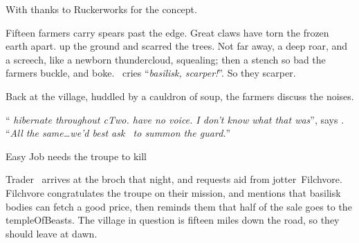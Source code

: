 \documentclass[10pt,twoside]{book}
\begin{document}

{
  \footnotesize

  \vfill
  {\sffamily With thanks to Ruckerworks for the concept.}
}

\clearpage


\pagestyle{minizine}%

\begin{exampletext}
  Fifteen farmers carry spears past the \gls{edge}.
  Great claws have torn
  \ifnum{}%
    the frozen earth apart.
  \else%
  up the ground and scarred the trees.
  \fi%
  Not far away, a deep roar, and a screech, like a newborn thundercloud, squealing;
  then a stench so bad the farmers buckle, and boke.
  \marketBoatman\ cries ``\textit{\gls{basilisk}, scarper!}''.
  So they scarper.

  Back at the \gls{village}, huddled by a cauldron of soup, the farmers discuss the noises.

  ``\textit{\ifnum{}
     hibernate throughout \gls{cTwo}.
  \else%
     have no voice.
  \fi%
  I don't know what that was}'', says \marketBoatman.
  ``\textit{All the same\ldots we'd best ask \marketFence\ to summon the \gls{guard}.}''
\end{exampletext}

{Easy Job}%
{ needs the troupe to kill }%

Trader \marketFence\ arrives at the \gls{broch} that night, and requests aid from \gls{jotter}~Filchvore.
Filchvore congratulates the troupe on their mission, and mentions that \gls{basilisk} bodies can fetch a good price, then reminds them that half of the sale goes to the \gls{templeOfBeasts}.
The \gls{village} in question is fifteen miles down the road, so they should leave at dawn.

\iftoggle{intro}{
  \paragraph{If \pgls{pc} asks for better \glspl{weapon},}
  they can roll \roll{Charisma}{Empathy} at \tn[10].
  Success means the \emph{player} should interpret how the character might ask for free equipment.

  \paragraph{If \pgls{pc} chats to other \glspl{guard} in the \gls{broch},}
  \gls{gDigger}~\composeHumanName\ laughs at the notion of \pgls{basilisk} roaring.

  \begin{speechtext}
    \Glspl{monster} don't roar.
    That's why people call them `the voiceless'.
  \end{speechtext}
}{}
\end{document}
